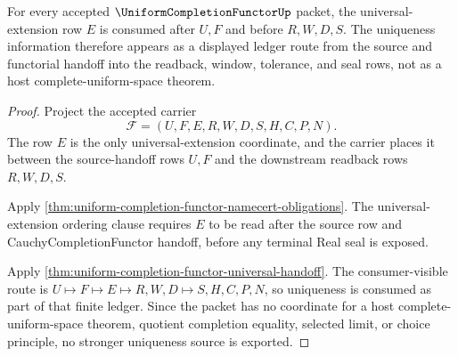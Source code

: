 \begin{theorem}
\label{thm:uniform-completion-functor-universal-extension-uniqueness-route}
For every accepted $\UniformCompletionFunctorUp$ packet, the universal-extension row $E$ is consumed after $U,F$ and before $R,W,D,S$. The uniqueness information therefore appears as a displayed ledger route from the source and functorial handoff into the readback, window, tolerance, and seal rows, not as a host complete-uniform-space theorem.
\end{theorem}
\begin{proof}
Project the accepted carrier
$$
\mathcal{F}=(U,F,E,R,W,D,S,H,C,P,N).
$$
The row $E$ is the only universal-extension coordinate, and the carrier places it between the source-handoff rows $U,F$ and the downstream readback rows $R,W,D,S$.

Apply \autoref{thm:uniform-completion-functor-namecert-obligations}. The universal-extension ordering clause requires $E$ to be read after the source row and CauchyCompletionFunctor handoff, before any terminal Real seal is exposed.

Apply \autoref{thm:uniform-completion-functor-universal-handoff}. The consumer-visible route is $U \longmapsto F \longmapsto E \longmapsto R,W,D \longmapsto S,H,C,P,N$, so uniqueness is consumed as part of that finite ledger. Since the packet has no coordinate for a host complete-uniform-space theorem, quotient completion equality, selected limit, or choice principle, no stronger uniqueness source is exported.
\end{proof}

